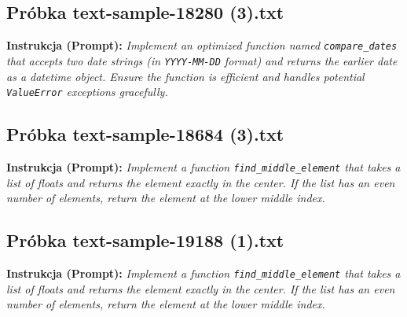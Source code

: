 


\subsection{Próbka text-sample-18280 (3).txt}
\label{sec:lst:text-sample-18280-3}
\textbf{Instrukcja (Prompt):} \textit{Implement an optimized function named \texttt{compare\_dates} that accepts two date strings (in \texttt{YYYY-MM-DD} format) and returns the earlier date as a datetime object. Ensure the function is efficient and handles potential \texttt{ValueError} exceptions gracefully.}




\subsection{Próbka text-sample-18684 (3).txt}
\label{sec:lst:text-sample-18684-3}
\textbf{Instrukcja (Prompt):} \textit{Implement a function \texttt{find\_middle\_element} that takes a list of floats and returns the element exactly in the center. If the list has an even number of elements, return the element at the lower middle index.}




\subsection{Próbka text-sample-19188 (1).txt}
\label{sec:lst:text-sample-19188-1}
\textbf{Instrukcja (Prompt):} \textit{Implement a function \texttt{find\_middle\_element} that takes a list of floats and returns the element exactly in the center. If the list has an even number of elements, return the element at the lower middle index.}




